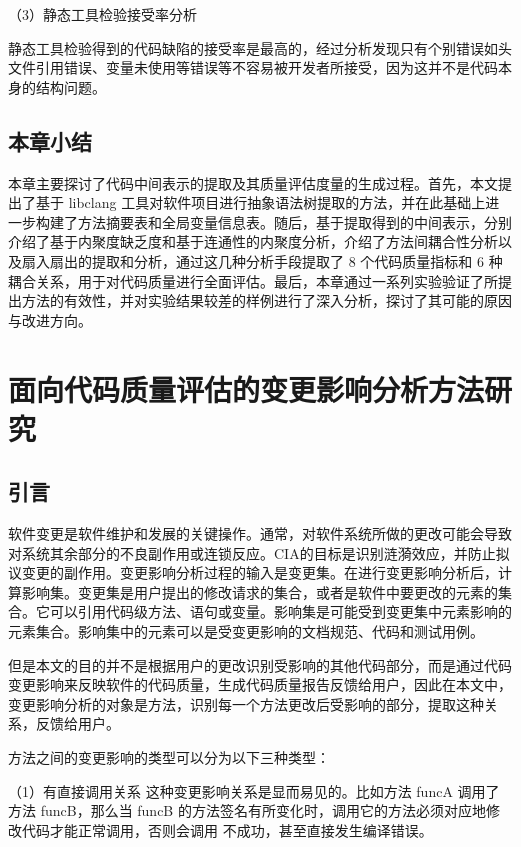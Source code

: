 （3）静态工具检验接受率分析

静态工具检验得到的代码缺陷的接受率是最高的，经过分析发现只有个别错误如头文件引用错误、变量未使用等错误等不容易被开发者所接受，因为这并不是代码本身的结构问题。

\section{本章小结}

本章主要探讨了代码中间表示的提取及其质量评估度量的生成过程。首先，本文提出了基于 libclang 工具对软件项目进行抽象语法树提取的方法，并在此基础上进一步构建了方法摘要表和全局变量信息表。随后，基于提取得到的中间表示，分别介绍了基于内聚度缺乏度和基于连通性的内聚度分析，介绍了方法间耦合性分析以及扇入扇出的提取和分析，通过这几种分析手段提取了 8 个代码质量指标和 6 种耦合关系，用于对代码质量进行全面评估。最后，本章通过一系列实验验证了所提出方法的有效性，并对实验结果较差的样例进行了深入分析，探讨了其可能的原因与改进方向。

\chapter{面向代码质量评估的变更影响分析方法研究}
\section{引言}

软件变更是软件维护和发展的关键操作。通常，对软件系统所做的更改可能会导致对系统其余部分的不良副作用或连锁反应。CIA的目标是识别涟漪效应，并防止拟议变更的副作用。变更影响分析过程的输入是变更集。在进行变更影响分析后，计算影响集。变更集是用户提出的修改请求的集合，或者是软件中要更改的元素的集合。它可以引用代码级方法、语句或变量。影响集是可能受到变更集中元素影响的元素集合。影响集中的元素可以是受变更影响的文档规范、代码和测试用例。

但是本文的目的并不是根据用户的更改识别受影响的其他代码部分，而是通过代码变更影响来反映软件的代码质量，生成代码质量报告反馈给用户，因此在本文中，变更影响分析的对象是方法，识别每一个方法更改后受影响的部分，提取这种关系，反馈给用户。

方法之间的变更影响的类型可以分为以下三种类型：

（1）有直接调用关系
这种变更影响关系是显而易见的。比如方法 funcA 调用了方法 funcB，那么当 funcB
的方法签名有所变化时，调用它的方法必须对应地修改代码才能正常调用，否则会调用
不成功，甚至直接发生编译错误。

